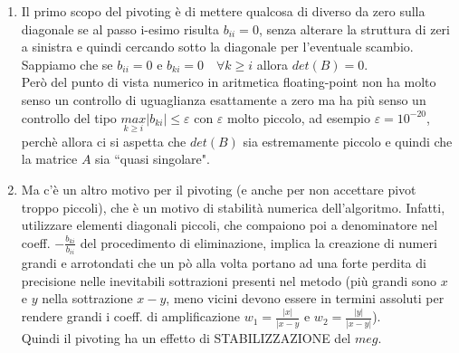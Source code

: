 \begin{enumerate}
\item Il primo scopo del pivoting è di mettere qualcosa di diverso da zero sulla diagonale se al passo i-esimo risulta $b_{ii}=0$, senza alterare la struttura di zeri a sinistra e quindi cercando sotto la diagonale per l'eventuale scambio.\\Sappiamo che se $b_{ii}=0$ e $b_{ki}=0\quad \forall k\geq i$ allora $det(B)=0$.\\Però del punto di vista numerico in aritmetica floating-point non ha molto senso un controllo di uguaglianza esattamente a zero ma ha più senso un controllo del tipo $\underset{k\geq i}{max}|b_{ki}|\leq \varepsilon$ con $\varepsilon$ molto piccolo, ad esempio $\varepsilon=10^{-20}$, perchè allora ci si aspetta che $det(B)$ sia estremamente piccolo e quindi che la matrice $A$ sia ``quasi singolare".
\item Ma c'è un altro motivo per il pivoting (e anche per non accettare pivot troppo piccoli), che è un motivo di stabilità numerica dell'algoritmo. Infatti, utilizzare elementi diagonali piccoli, che compaiono poi a denominatore nel coeff. $-\frac{b_{ki}}{b_{ii}}$ del procedimento di eliminazione, implica la creazione di numeri grandi e arrotondati che un pò alla volta portano ad una forte perdita di precisione nelle inevitabili sottrazioni presenti nel metodo (più grandi sono $x$ e $y$ nella sottrazione $x-y$, meno vicini devono essere in termini assoluti per rendere grandi i coeff. di amplificazione $w_1=\frac{|x|}{|x-y}$ e $w_2=\frac{|y|}{|x-y|}$).\\Quindi il pivoting ha un effetto di STABILIZZAZIONE del $meg$.\\\\
\end{enumerate}

